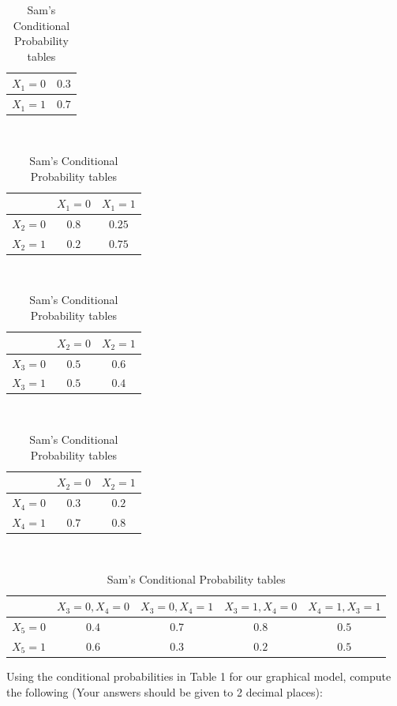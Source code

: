 \documentclass[11pt,addpoints,answers]{exam}
\begin{document}
\begin{questions}
\begin{table}[H]
    \centering
    \begin{tabular}{|c|c|}
    \hline
         $X_1=0$ & $0.3$  \\ \hline
         $X_1=1$ & $0.7$    \\  \hline
    \end{tabular}
    \\[0.1 in] 
    \begin{tabular}{|c|c|c|}
    \hline
            & $X_1=0$ & $X_1=1$   \\  \hline
        $X_2=0$ & $0.8$ & $0.25$ \\  \hline
        $X_2=1$ & $0.2$  & $0.75$    \\  \hline
    \end{tabular}
    \\[0.1 in] 
    \begin{tabular}{|c|c|c|}
    \hline
            & $X_2=0$ & $X_2=1$   \\  \hline
        $X_3=0$ & $0.5$ & $0.6$ \\  \hline
        $X_3=1$ & $0.5$  & $0.4$    \\  \hline
    \end{tabular}
    \\[0.1 in] 
    \begin{tabular}{|c|c|c|}
    \hline
            & $X_2=0$ & $X_2=1$   \\  \hline
        $X_4=0$ & $0.3$ & $0.2$ \\  \hline
        $X_4=1$ & $0.7$  & $0.8$    \\  \hline
    \end{tabular}
    \\[0.1 in] 
    \begin{tabular}{|c|c|c|c|c|}
    \hline
            & $X_3=0, X_4=0$ & $X_3=0,X_4=1$ & $X_3=1,X_4=0$ & $X_4=1,X_3=1$   \\  \hline
        $X_5=0$ & $0.4$ & $0.7$ & $0.8$ & $0.5$ \\  \hline
        $X_5=1$ & $0.6$  & $0.3$ & $0.2$ & $0.5$    \\  \hline
    \end{tabular}
    \caption{Sam's Conditional Probability tables}
\end{table}

\clearpage
Using the conditional probabilities in Table 1 for our graphical model, compute the following (Your answers should be given to 2 decimal places): 
\end{questions}
\end{document}
